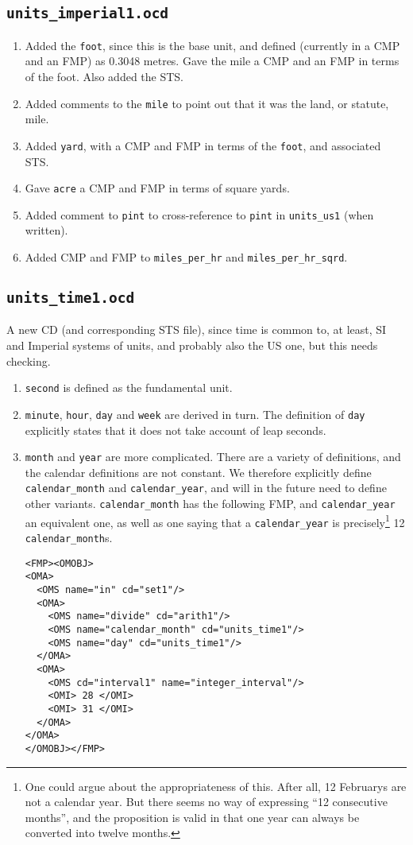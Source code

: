 \documentclass[11pt]{openmathTN}
\def\action#1{\hfill\rlap{\bf #1}}
\begin{document}
\subsection{{\tt units\_imperial1.ocd}}
\begin{enumerate}
\item Added the {\tt foot}, since this is the base unit, and defined
(currently in a CMP and an FMP) as 0.3048 metres. Gave the mile a CMP and
an FMP in terms of the foot. Also added the STS.
\item Added comments to the {\tt mile} to point out that it was the land,
or statute, mile.
\item Added {\tt yard}, with a CMP and FMP in terms of the {\tt foot}, and
associated STS.
\item Gave {\tt acre} a CMP and FMP in terms of square yards.
\item Added comment to {\tt pint} to cross-reference to {\tt pint} in
\verb+units_us1+ (when written).
\item Added CMP and FMP to \verb+miles_per_hr+ and
\verb+miles_per_hr_sqrd+. 
\end{enumerate}
\subsection{{\tt units\_time1.ocd}}\label{timesect}
A new CD (and corresponding STS file), since time is common to, at least,
SI and Imperial systems of units, and probably also the US one, but this
needs checking.\action{JHD}
\begin{enumerate}
\item \verb+second+ is defined as the fundamental unit.
\item \verb+minute+, \verb+hour+, \verb+day+ and \verb+week+ are derived in
turn. The definition of \verb+day+ explicitly states that it does not take
account of leap seconds.
\item {\tt month} and {\tt year} are more complicated. There are a variety
of definitions, and the calendar definitions are not constant. We therefore
explicitly define \verb+calendar_month+ and \verb+calendar_year+, and will
in the future need to define other variants. \verb+calendar_month+ has the
following FMP, and \verb+calendar_year+ an equivalent one, as well as one
saying that a \verb+calendar_year+ is precisely\footnote{One could argue
about the appropriateness of this. After all, 12 Februarys are not a
calendar year. But there seems no way of expressing ``12 consecutive
months'', and the proposition is valid in that one year can always be
converted into twelve months.} 12 \verb+calendar_month+s.
\begin{verbatim}
<FMP><OMOBJ>
<OMA>
  <OMS name="in" cd="set1"/>
  <OMA>
    <OMS name="divide" cd="arith1"/>
    <OMS name="calendar_month" cd="units_time1"/>
    <OMS name="day" cd="units_time1"/>
  </OMA>
  <OMA>
    <OMS cd="interval1" name="integer_interval"/>
    <OMI> 28 </OMI>
    <OMI> 31 </OMI>
  </OMA>
</OMA>
</OMOBJ></FMP>
\end{verbatim}
\end{enumerate}
\end{document}
